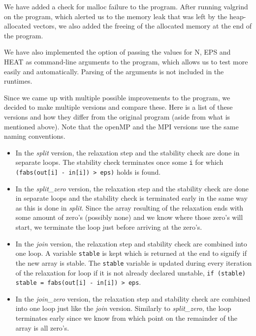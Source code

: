 \documentclass[a4paper]{article}
\begin{document}
\noindent We have added a check for malloc failure to the program. After running valgrind on the program, which alerted us to the memory leak that was left by the heap-allocated vectors, we also added the freeing of the allocated memory at the end of the program. 

We have also implemented the option of passing the values for N, EPS and HEAT as command-line arguments to the program, which allows us to test more easily and automatically. Parsing of the arguments is not included in the runtimes.

Since we came up with multiple possible improvements to the program, we decided to make multiple versions and compare these. Here is a list of these versions and how they differ from the original program (aside from what is mentioned above). Note that the openMP and the MPI versions use the same naming conventions.
\begin{itemize}
    \item
        In the \textit{split} version, the relaxation step and the stability check are done in separate loops. The stability check terminates once some \texttt{i} for which \texttt{(fabs(out[i] - in[i]) > eps)} holds is found.
    \item
        In the \textit{split\_zero} version, the relaxation step and the stability check are done in separate loops and the stability check is terminated early in the same way as this is done in \textit{split}. Since the array resulting of the relaxation ends with some amount of zero's (possibly none) and we know where those zero's will start, we terminate the loop just before arriving at the zero's.
    \item
        In the \textit{join} version, the relaxation step and stability check are combined into one loop. A variable \texttt{stable} is kept which is returned at the end to signify if the new array is stable. The \texttt{stable} variable is updated during every iteration of the relaxation for loop if it is not already declared unstable, \texttt{if (stable) stable = fabs(out[i] - in[i]) > eps}.
    \item
        In the \textit{join\_zero} version, the relaxation step and stability check are combined into one loop just like the \textit{join} version. Similarly to \textit{split\_zero}, the loop terminates early since we know from which point on the remainder of the array is all zero's.
\end{itemize}

\end{document}
